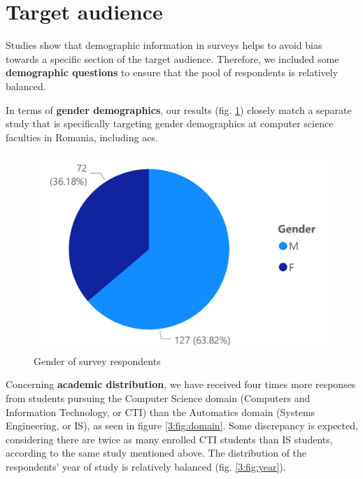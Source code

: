 \section{Target audience} \label{3:target_audience}

Studies\cite{hammer2011importance}\cite{connelly2013demographic} show that demographic information in surveys helps to avoid bias towards a specific section of the target audience. Therefore, we included some \textbf{demographic questions} to ensure that the pool of respondents is relatively balanced.

In terms of \textbf{gender demographics}, our results (fig. \ref{3:fig:gender}) closely match a separate study\cite{codette2019stats} that is specifically targeting gender demographics at computer science faculties in Romania, including \acrshort{acs}.

\begin{figure}[ht]
    \centering
         \includegraphics[height=0.2\textheight]{figures/charts/survey/gender.pdf}
    \caption{Gender of survey respondents}
    \label{3:fig:gender}
\end{figure}

Concerning \textbf{academic distribution}, we have received four times more responses from students pursuing the Computer Science domain (Computers and Information Technology, or CTI) than the Automatics domain (Systems Engineering, or IS), as seen in figure \ref{3:fig:domain}. Some discrepancy is expected, considering there are twice as many enrolled CTI students than IS students, according to the same study\cite{codette2019stats} mentioned above. The distribution of the respondents' year of study is relatively balanced (fig. \ref{3:fig:year}).

